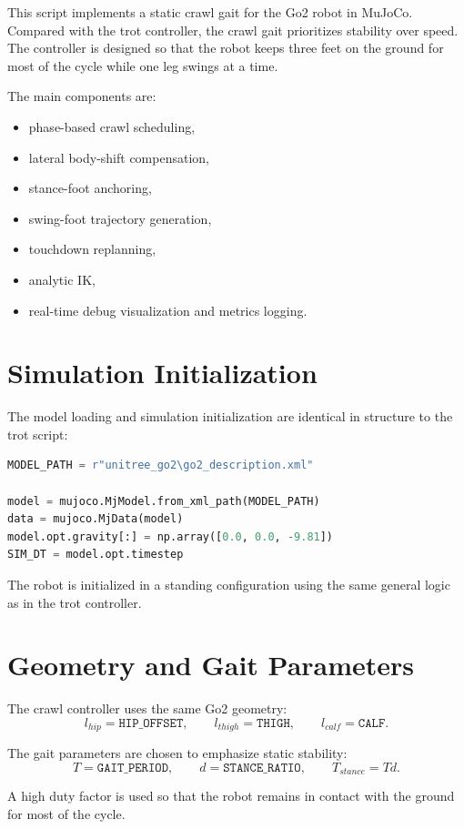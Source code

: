 \documentclass[11pt,a4paper]{report}
\begin{document}
This script implements a static crawl gait for the Go2 robot in MuJoCo. Compared with the trot controller, the crawl gait prioritizes stability over speed. The controller is designed so that the robot keeps three feet on the ground for most of the cycle while one leg swings at a time.

The main components are:
\begin{itemize}
    \item phase-based crawl scheduling,
    \item lateral body-shift compensation,
    \item stance-foot anchoring,
    \item swing-foot trajectory generation,
    \item touchdown replanning,
    \item analytic IK,
    \item real-time debug visualization and metrics logging.
\end{itemize}

\section{Simulation Initialization}

The model loading and simulation initialization are identical in structure to the trot script:
\begin{lstlisting}[language=Python]
MODEL_PATH = r"unitree_go2\go2_description.xml"

model = mujoco.MjModel.from_xml_path(MODEL_PATH)
data = mujoco.MjData(model)
model.opt.gravity[:] = np.array([0.0, 0.0, -9.81])
SIM_DT = model.opt.timestep
\end{lstlisting}

The robot is initialized in a standing configuration using the same general logic as in the trot controller.

\section{Geometry and Gait Parameters}

The crawl controller uses the same Go2 geometry:
\[
l_{hip} = \texttt{HIP\_OFFSET}, \qquad
l_{thigh} = \texttt{THIGH}, \qquad
l_{calf} = \texttt{CALF}.
\]

The gait parameters are chosen to emphasize static stability:
\[
T = \texttt{GAIT\_PERIOD}, \qquad
d = \texttt{STANCE\_RATIO}, \qquad
T_{stance} = Td.
\]

A high duty factor is used so that the robot remains in contact with the ground for most of the cycle.
\end{document}
